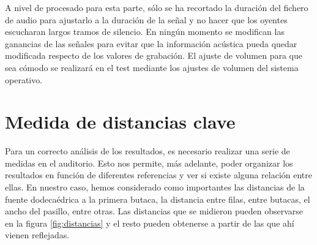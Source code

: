 \documentclass[11pt,a4paper]{book}
\begin{document}
            A nivel de procesado para esta parte, sólo se ha recortado la duración del fichero de audio para ajustarlo a la duración de la señal y no hacer que los oyentes escucharan largos tramos de silencio. En ningún momento se modifican las ganancias de las señales para evitar que la información acústica pueda quedar modificada respecto de los valores de grabación. El ajuste de volumen para que sea cómodo se realizará en el test mediante los ajustes de volumen del sistema operativo.
            
    \section{Medida de distancias clave}
        Para un correcto análisis de los resultados, es necesario realizar una serie de medidas en el auditorio. Esto nos permite, más adelante, poder organizar los resultados en función de diferentes referencias y ver si existe alguna relación entre ellas. En nuestro caso, hemos considerado como importantes las distancias de la fuente dodecaédrica a la primera butaca, la distancia entre filas, entre butacas, el ancho del pasillo, entre otras. Las distancias que se midieron pueden observarse en la figura \ref{fig:distancias} y el resto pueden obtenerse a partir de las que ahí vienen reflejadas.
        
\end{document}
